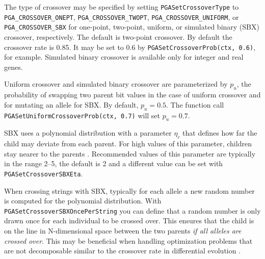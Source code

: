 \documentclass{report}
\begin{document}
\begin{sloppypar}
%
%
The type of crossover may be specified by setting \verb+PGASetCrossoverType+
to \verb+PGA_CROSSOVER_ONEPT+, \verb+PGA_CROSSOVER_TWOPT+,
\verb+PGA_CROSSOVER_UNIFORM+, or \verb+PGA_CROSSOVER_SBX+ for one-point,
two-point, uniform, or simulated binary (SBX) crossover,
respectively.  The default is two-point crossover.  By default the crossover
rate is 0.85.  It may be set to 0.6 by {\tt PGASetCrossoverProb(ctx, 0.6)},
for example. Simulated binary crossover is available only for integer
and real genes.
\end{sloppypar}

Uniform crossover and simulated binary crossover are parameterized by
$p_u$, the probability of swapping two parent bit values \cite{SpDe91}
in the case of uniform crossover and for mutating an allele for SBX.
By default, $p_u = 0.5$.  The function call {\tt
PGASetUniformCrossoverProb(ctx, 0.7)} will set $p_u = 0.7$.

SBX uses a polynomial distribution with a parameter $\eta_c$ that defines
how far the child may deviate from each parent. For high values of this
parameter, children stay nearer to the parents \cite{DA95}. Recommended
values of this parameter are typically in the range 2--5, the default is
2 and a different value can be set with \verb+PGASetCrossoverSBXEta+.

When crossing strings with SBX, typically for each allele a new random
number is computed for the polynomial distribution. With
\verb+PGASetCrossoverSBXOncePerString+ you can define that a random
number is only drawn once for each individual to be crossed over.
This ensures that the child is on the line in N-dimensional space
between the two parents \textit{if all alleles are crossed over}.
This may be beneficial when handling optimization problems that are not
decomposable \cite{Sal96} similar to the crossover rate in differential
evolution \cite[p.~98]{PSL05}.
\end{document}

